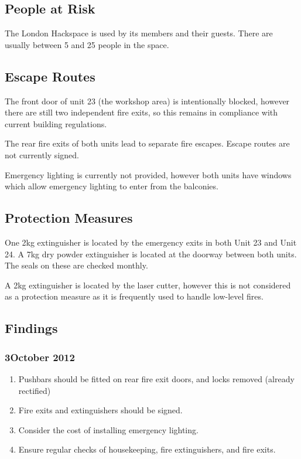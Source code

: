 \subsection{People at Risk}

The London Hackspace is used by its members and their guests. There are
usually between 5 and 25 people in the space.

\subsection{Escape Routes}

The front door of unit 23 (the workshop area) is intentionally blocked,
however there are still two independent fire exits, so this remains in
compliance with current building regulations.

The rear fire exits of both units lead to separate fire escapes. Escape
routes are not currently signed.

Emergency lighting is currently not provided, however both units have
windows which allow emergency lighting to enter from the balconies.

\subsection{Protection Measures}

One 2kg \COtwo extinguisher is located by the emergency exits in both Unit
23 and Unit 24. A 7kg dry powder extinguisher is located at the doorway
between both units. The seals on these are checked monthly.

A 2kg \COtwo extinguisher is located by the laser cutter, however this is
not considered as a protection measure as it is frequently used to
handle low-level fires.

\subsection{Findings}

\subsubsection{3\rd October 2012}
\begin{enumerate}
\item
  Pushbars should be fitted on rear fire exit doors, and locks removed
  (already rectified)
\item
  Fire exits and extinguishers should be signed.
\item
  Consider the cost of installing emergency lighting.
\item
  Ensure regular checks of housekeeping, fire extinguishers, and fire
  exits.
\end{enumerate}

